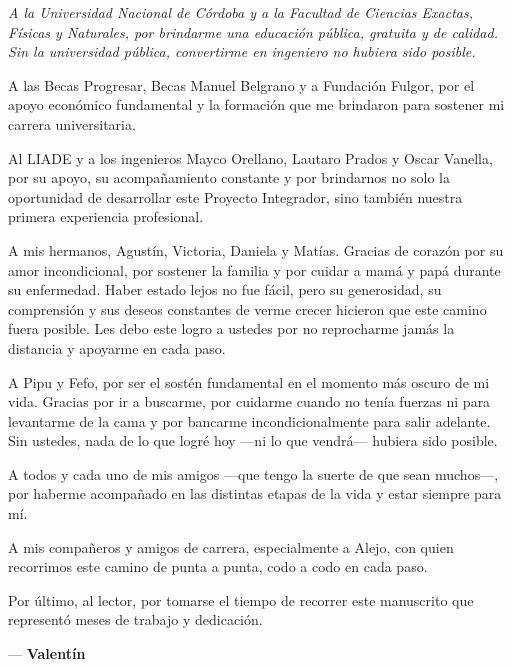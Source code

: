 \begin{flushright}
\begin{minipage}{0.85\textwidth}
    \small %
    \itshape
    A la Universidad Nacional de Córdoba y a la Facultad de Ciencias Exactas, Físicas y Naturales, por brindarme una educación pública, gratuita y de calidad. Sin la universidad pública, convertirme en ingeniero no hubiera sido posible.

    \vspace{0.2cm}
    A las Becas Progresar, Becas Manuel Belgrano y a Fundación Fulgor, por el apoyo económico fundamental y la formación que me brindaron para sostener mi carrera universitaria.

    \vspace{0.2cm}
    Al LIADE y a los ingenieros Mayco Orellano, Lautaro Prados y Oscar Vanella, por su apoyo, su acompañamiento constante y por brindarnos no solo la oportunidad de desarrollar este Proyecto Integrador, sino también nuestra primera experiencia profesional.

    \vspace{0.2cm}
    A mis hermanos, Agustín, Victoria, Daniela y Matías. Gracias de corazón por su amor incondicional, por sostener la familia y por cuidar a mamá y papá durante su enfermedad. Haber estado lejos no fue fácil, pero su generosidad, su comprensión y sus deseos constantes de verme crecer hicieron que este camino fuera posible. Les debo este logro a ustedes por no reprocharme jamás la distancia y apoyarme en cada paso.

    \vspace{0.2cm}
    A Pipu y Fefo, por ser el sostén fundamental en el momento más oscuro de mi vida. Gracias por ir a buscarme, por cuidarme cuando no tenía fuerzas ni para levantarme de la cama y por bancarme incondicionalmente para salir adelante. Sin ustedes, nada de lo que logré hoy —ni lo que vendrá— hubiera sido posible.

    \vspace{0.2cm}
    A todos y cada uno de mis amigos —que tengo la suerte de que sean muchos—, por haberme acompañado en las distintas etapas de la vida y estar siempre para mí.

    \vspace{0.2cm}
    A mis compañeros y amigos de carrera, especialmente a Alejo, con quien recorrimos este camino de punta a punta, codo a codo en cada paso.

    \vspace{0.2cm}
    Por último, al lector, por tomarse el tiempo de recorrer este manuscrito que representó meses de trabajo y dedicación.

    \vspace{0.3cm}
    \raggedleft — \textbf{Valentín}
\end{minipage}
\end{flushright}